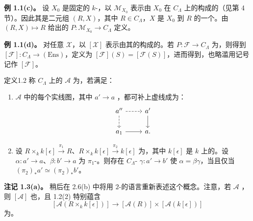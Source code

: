 \textbf{例 1.1(c)。} 设 $X_0$ 是固定的 $k$-，以 $\mathcal M_{X_0}$ 表示由 $X_0$ 在 $C_\Lambda$ 上的构成的（见第 4 节）。因此其是二元组 $(R,X)$，其中 $R\in C_\Lambda$，$X$ 是 $X_0$ 到 $R$ 的一个。由 $(R,X)\mapsto R$ 给出的 $P:\mathcal M_{X_0}\to C_\Lambda$ 定义。

\textbf{例 1.1(d)。} 对任意 $\mathcal X$，以 $[\mathcal X]$ 表示由其的构成的。若 $P:\mathcal F\to C_\Lambda$ 为，则得到 $[\mathcal F]:C_\Lambda\to(\mathrm{Ens})$，定义为 $[\mathcal F](S)=[\mathcal F(S)]$，进而得到，也略滥用记号记作 $[\mathcal F]$。
\begin{SGAresult}{定义}{1.2}
称 $C_\Lambda$ 上的 $\mathcal A$ 为，若满足：
\begin{enumerate}
\item[(1)] $\mathcal A$ 中的每个实线图，其中 $a'\to a$ ，都可补上虚线成为：
\[\begin{tikzcd}a''\arrow[r,dashed]\arrow[d,dashed]&a'\arrow[d]\\a_1\arrow[r]&a.\end{tikzcd}\]
\item[(2)] 设 $R\times_k k[\epsilon]\xrightarrow{\pi_1}R$、$R\times_k k[\epsilon]\xrightarrow{\pi_2}k[\epsilon]$ 为，其中 $k[\epsilon]$ 是 $k$ 上的。设 $\alpha:a'\to a$、$\beta:b'\to a$ 为 $\pi_1$-。则存在 $C_\Lambda$- $\gamma:a'\to b'$ 使 $\alpha=\beta\gamma$，当且仅当 $(\pi_2)_*a'\simeq(\pi_2)_*b'$。
\end{enumerate}
\end{SGAresult}
\textbf{注记 1.3(a)。} 稍后在 2.6(b) 中将用 $2$-的语言重新表述这个概念。注意，若 $\mathcal A$ ，则 $[\mathcal A]$ 也，且 1.2(2) 特别蕴含
\[[\mathcal A(R\times_k k[\epsilon])]\longrightarrow[\mathcal A(R)]\times[\mathcal A(k[\epsilon])]\]
为。

